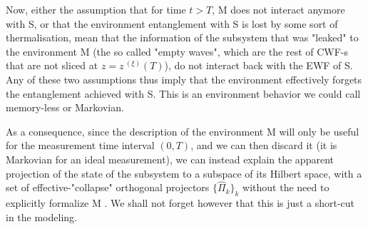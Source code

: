 \documentclass[11pt, a4paper]{article} %
\begin{document}
Now, either the assumption that for time $t>T$, M does not interact anymore with S, or that the environment entanglement with S is lost by some sort of thermalisation, mean that the information of the subsystem that was "leaked" to the environment M (the so called "empty waves", which are the rest of CWF-s that are not sliced at $z=z^{\:(\xi)}(T)$), do not interact back with the EWF of S. Any of these two assumptions thus imply that the environment effectively forgets the entanglement achieved with S. This is an environment behavior we could call memory-less or Markovian.\vspace{-0.1cm}

As a consequence, since the description of the environment M will only be useful for the measurement time interval $(0,T)$, and we can then discard it (it is Markovian for an ideal measurement), we can instead explain the apparent projection of the state of the subsystem to a subspace of its Hilbert space, with a set of effective-"collapse" orthogonal projectors $\{\hat{\Pi}_k\}_k$ without the need to explicitly formalize M \cite{Durr}. We shall not forget however that this is just a short-cut in the modeling.\vspace{-0.25cm}
\end{document}
